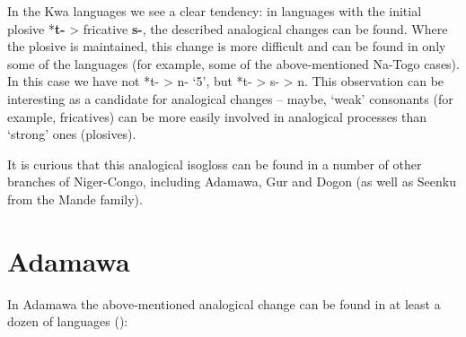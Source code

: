 \begin{table}
\caption{\label{tab:2:18}Kwa initial consonants in `3'-'5'}

\end{table}

In the Kwa languages we see a clear tendency: in languages with the initial plosive *\textbf{t-} > fricative \textbf{s-}, the described analogical changes can be found. Where the plosive is maintained, this change is more difficult and can be found in only some of the languages (for example, some of the above-mentioned Na-Togo cases). In this case we have not *t- > n- ‘5’, but *t- > s- > n. This observation can be interesting as a candidate for analogical changes – maybe, ‘weak’ consonants (for example, fricatives) can be more easily involved in analogical processes than ‘strong’ ones (plosives). 

It is curious that this analogical isogloss can be found in a number of other branches of Niger-Congo, including Adamawa, Gur and Dogon (as well as Seenku from the Mande family). 

 
\section{Adamawa}%

In Adamawa the above-mentioned analogical change can be found in at least a dozen of languages (): 

